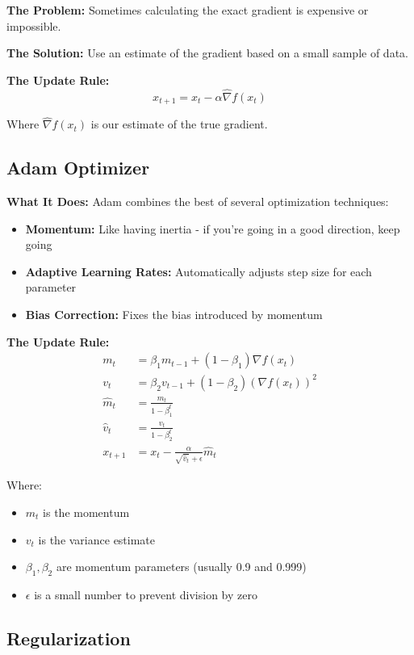 \documentclass[12pt]{article}
\begin{document}
\textbf{The Problem:}
Sometimes calculating the exact gradient is expensive or impossible.

\textbf{The Solution:}
Use an estimate of the gradient based on a small sample of data.

\textbf{The Update Rule:}
$$x_{t+1} = x_t - \alpha \hat{\nabla} f(x_t)$$

Where $\hat{\nabla} f(x_t)$ is our estimate of the true gradient.

\subsection{Adam Optimizer}

\textbf{What It Does:}
Adam combines the best of several optimization techniques:
\begin{itemize}
    \item \textbf{Momentum:} Like having inertia - if you're going in a good direction, keep going
    \item \textbf{Adaptive Learning Rates:} Automatically adjusts step size for each parameter
    \item \textbf{Bias Correction:} Fixes the bias introduced by momentum
\end{itemize}

\textbf{The Update Rule:}
\begin{align}
m_t &= \beta_1 m_{t-1} + (1-\beta_1) \nabla f(x_t) \\
v_t &= \beta_2 v_{t-1} + (1-\beta_2) (\nabla f(x_t))^2 \\
\hat{m}_t &= \frac{m_t}{1-\beta_1^t} \\
\hat{v}_t &= \frac{v_t}{1-\beta_2^t} \\
x_{t+1} &= x_t - \frac{\alpha}{\sqrt{\hat{v}_t} + \epsilon} \hat{m}_t
\end{align}

Where:
\begin{itemize}
    \item $m_t$ is the momentum
    \item $v_t$ is the variance estimate
    \item $\beta_1, \beta_2$ are momentum parameters (usually 0.9 and 0.999)
    \item $\epsilon$ is a small number to prevent division by zero
\end{itemize}

\subsection{Regularization}
\end{document}
